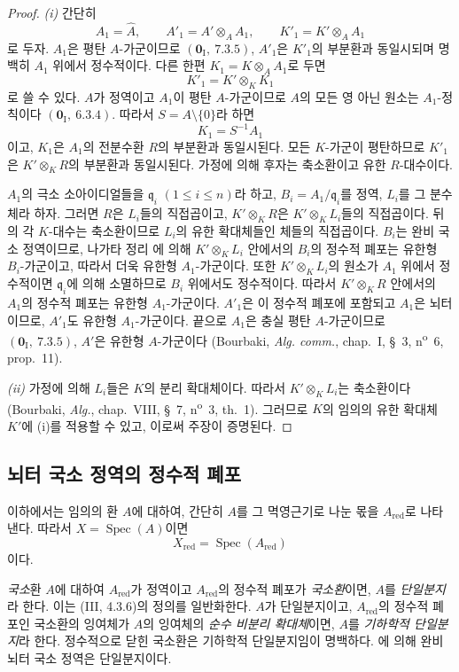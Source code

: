 \begin{proof}
\emph{(i)} 간단히
\[
  A_1=\widehat A,\qquad A'_1=A'\otimes_AA_1,\qquad
  K'_1=K'\otimes_AA_1
\]
로 두자. $A_1$은 평탄 $A$-가군이므로
$(\mathbf 0_{\mathrm I},~7.3.5)$, $A'_1$은 $K'_1$의 부분환과
동일시되며 명백히 $A_1$ 위에서 정수적이다. 다른 한편
$K_1=K\otimes_AA_1$로 두면
\[
  K'_1=K'\otimes_KK_1
\]
로 쓸 수 있다. $A$가 정역이고 $A_1$이 평탄 $A$-가군이므로 $A$의
모든 영 아닌 원소는 $A_1$-정칙이다
$(\mathbf 0_{\mathrm I},~6.3.4)$. 따라서
$S=A\setminus\{0\}$라 하면
\[
  K_1=S^{-1}A_1
\]
이고, $K_1$은 $A_1$의 전분수환 $R$의 부분환과 동일시된다. 모든
$K$-가군이 평탄하므로 $K'_1$은 $K'\otimes_KR$의 부분환과
동일시된다. 가정에 의해 후자는 축소환이고 유한 $R$-대수이다.

$A_1$의 극소 소아이디얼들을
$\mathfrak q_i$ $(1\leq i\leq n)$라 하고,
$B_i=A_1/\mathfrak q_i$를 정역, $L_i$를 그 분수체라 하자. 그러면
$R$은 $L_i$들의 직접곱이고, $K'\otimes_KR$은
$K'\otimes_KL_i$들의 직접곱이다. 뒤의 각 $K$-대수는 축소환이므로
$L_i$의 유한 확대체들인 체들의 직접곱이다. $B_i$는 완비 국소
정역이므로, 나가타 정리 에 의해
$K'\otimes_KL_i$ 안에서의 $B_i$의 정수적 폐포는 유한형
$B_i$-가군이고, 따라서 더욱 유한형 $A_1$-가군이다. 또한
$K'\otimes_KL_i$의 원소가 $A_1$ 위에서 정수적이면
$\mathfrak q_i$에 의해 소멸하므로 $B_i$ 위에서도 정수적이다.
따라서 $K'\otimes_KR$ 안에서의 $A_1$의 정수적 폐포는 유한형
$A_1$-가군이다. $A'_1$은 이 정수적 폐포에 포함되고 $A_1$은
뇌터이므로, $A'_1$도 유한형 $A_1$-가군이다. 끝으로 $A_1$은 충실
평탄 $A$-가군이므로 $(\mathbf 0_{\mathrm I},~7.3.5)$, $A'$은 유한형
$A$-가군이다 (Bourbaki, \emph{Alg. comm.}, chap.~I, §~3,
n\textsuperscript{o}~6, prop.~11).


\emph{(ii)} 가정에 의해 $L_i$들은 $K$의 분리 확대체이다. 따라서
$K'\otimes_KL_i$는 축소환이다 (Bourbaki, \emph{Alg.}, chap.~VIII,
§~7, n\textsuperscript{o}~3, th.~1). 그러므로 $K$의 임의의 유한
확대체 $K'$에 (i)를 적용할 수 있고, 이로써 주장이 증명된다.
\end{proof}

\subsection{뇌터 국소 정역의 정수적 폐포}
\label{subsection:0.23.2-ko}

\begin{env}[23.2.1]
\label{0.23.2.1-ko}
이하에서는 임의의 환 $A$에 대하여, 간단히 $A$를 그 멱영근기로
나눈 몫을 $A_{\mathrm{red}}$로 나타낸다. 따라서
$X=\operatorname{Spec}(A)$이면
\[
  X_{\mathrm{red}}=\operatorname{Spec}(A_{\mathrm{red}})
\]
이다.

\emph{국소}환 $A$에 대하여 $A_{\mathrm{red}}$가 정역이고
$A_{\mathrm{red}}$의 정수적 폐포가 \emph{국소환}이면, $A$를
\emph{단일분지}라 한다. 이는 (III, 4.3.6)의 정의를 일반화한다.
$A$가 단일분지이고, $A_{\mathrm{red}}$의 정수적 폐포인 국소환의
잉여체가 $A$의 잉여체의 \emph{순수 비분리 확대체}이면, $A$를
\emph{기하학적 단일분지}라 한다. 정수적으로 닫힌 국소환은
기하학적 단일분지임이 명백하다. 에 의해 완비
뇌터 국소 정역은 단일분지이다.
\end{env}

